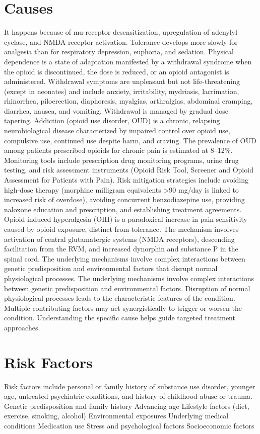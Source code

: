 \section{Causes}
It happens because of mu-receptor desensitization, upregulation of adenylyl cyclase, and NMDA receptor activation. Tolerance develops more slowly for analgesia than for respiratory depression, euphoria, and sedation. Physical dependence is a state of adaptation manifested by a withdrawal syndrome when the opioid is discontinued, the dose is reduced, or an opioid antagonist is administered. Withdrawal symptoms are unpleasant but not life-threatening (except in neonates) and include anxiety, irritability, mydriasis, lacrimation, rhinorrhea, piloerection, diaphoresis, myalgias, arthralgias, abdominal cramping, diarrhea, nausea, and vomiting. Withdrawal is managed by gradual dose tapering. Addiction (opioid use disorder, OUD) is a chronic, relapsing neurobiological disease characterized by impaired control over opioid use, compulsive use, continued use despite harm, and craving. The prevalence of OUD among patients prescribed opioids for chronic pain is estimated at 8--12\%. Monitoring tools include prescription drug monitoring programs, urine drug testing, and risk assessment instruments (Opioid Risk Tool, Screener and Opioid Assessment for Patients with Pain). Risk mitigation strategies include avoiding high-dose therapy (morphine milligram equivalents >90 mg/day is linked to increased risk of overdose), avoiding concurrent benzodiazepine use, providing naloxone education and prescription, and establishing treatment agreements. Opioid-induced hyperalgesia (OIH) is a paradoxical increase in pain sensitivity caused by opioid exposure, distinct from tolerance. The mechanism involves activation of central glutamatergic systems (NMDA receptors), descending facilitation from the RVM, and increased dynorphin and substance P in the spinal cord. The underlying mechanisms involve complex interactions between genetic predisposition and environmental factors that disrupt normal physiological processes. The underlying mechanisms involve complex interactions between genetic predisposition and environmental factors. Disruption of normal physiological processes leads to the characteristic features of the condition. Multiple contributing factors may act synergistically to trigger or worsen the condition. Understanding the specific cause helps guide targeted treatment approaches.
\section{Risk Factors}
Risk factors include personal or family history of substance use disorder, younger age, untreated psychiatric conditions, and history of childhood abuse or trauma. Genetic predisposition and family history Advancing age Lifestyle factors (diet, exercise, smoking, alcohol) Environmental exposures Underlying medical conditions Medication use Stress and psychological factors Socioeconomic factors

